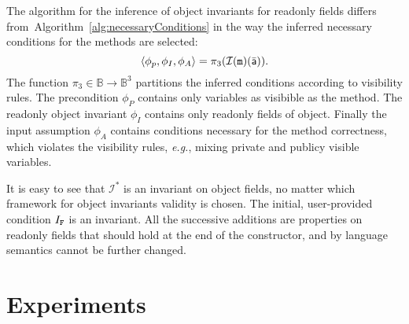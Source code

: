 \documentclass{llncs}
\newcommand{\refAlg}[1]{Algorithm~\ref{alg:#1}}
\newcommand{\Pre}[1]{\mathcal{I}(#1)}
\begin{document}
The algorithm for the inference of object invariants for readonly fields differs from~\refAlg{necessaryConditions} in the way the inferred necessary conditions for the methods are selected:
\[
\langle \phi_p, \phi_I, \phi_A  \rangle  = \pi_3(\Pre{\code{m}}(\ael{a})).
\]
The function $\pi_3 \in \mathbb{B} \rightarrow \mathbb{B}^3$ partitions the inferred conditions according to visibility rules.
The precondition  $\phi_P$  contains only variables as visibible as the method.
The readonly object invariant   $\phi_I$ contains only readonly fields of  object.
Finally the input assumption $\phi_A$  contains  conditions necessary for the method correctness, which violates the visibility rules, \emph{e.g.}, mixing private and publicy visible variables.

It is easy to see that $\mathcal{I}^*$ is an invariant on object fields, no matter which framework for object invariants validity is chosen.
The initial, user-provided condition $I_{\mathtt{F}}$ is an invariant. 
All the successive additions are properties on readonly fields that should hold at the end of the constructor, and by language semantics cannot be further changed.


\section{Experiments}



\end{document}
